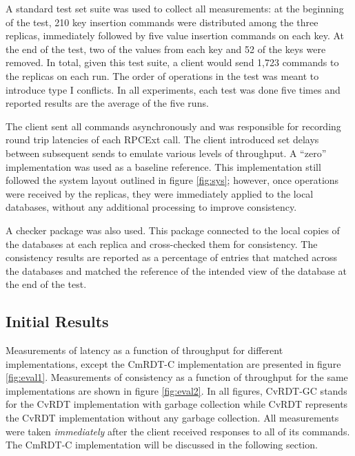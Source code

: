 \documentclass[sigconf,nonacm,10pt]{acmart}
\begin{document}
A standard test set suite was used to collect all measurements: at the beginning of the test, 210 key insertion commands were distributed among the three replicas, immediately followed by five value insertion commands on each key. At the end of the test, two of the values from each key and 52 of the keys were removed. In total, given this test suite, a client would send 1,723 commands to the replicas on each run. The order of operations in the test was meant to introduce type I conflicts. In all experiments, each test was done five times and reported results are the average of the five runs.

The client sent all commands asynchronously and was responsible for recording round trip latencies of each RPCExt call. The client introduced set delays between subsequent sends to emulate various levels of throughput. A ``zero'' implementation was used as a baseline reference. This implementation still followed the system layout outlined in figure \ref{fig:sys}; however, once operations were received by the replicas, they were immediately applied to the local databases, without any additional processing to improve consistency.

A checker package was also used. This package connected to the local copies of the databases at each replica and cross-checked them for consistency. The consistency results are reported as a percentage of entries that matched across the databases and matched the reference of the intended view of the database at the end of the test.

\subsection{Initial Results}
Measurements of latency as a function of throughput for different implementations, except the CmRDT-C implementation are presented in figure \ref{fig:eval1}. Measurements of consistency as a function of throughput for the same implementations are shown in figure \ref{fig:eval2}. In all figures, CvRDT-GC stands for the CvRDT implementation with garbage collection while CvRDT represents the CvRDT implementation without any garbage collection. All measurements were taken \emph{immediately} after the client received responses to all of its commands. The CmRDT-C implementation will be discussed in the following section.
\end{document}
